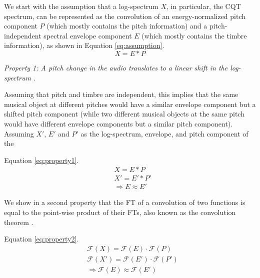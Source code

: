 \documentclass[journal]{IEEEtran}
\begin{document}


We start with the assumption that a log-spectrum $X$, in particular, the CQT spectrum, can be represented as the convolution of an energy-normalized pitch component $P$ (which mostly contains the pitch information) and a pitch-independent spectral envelope component $E$ (which mostly contains the timbre information), as shown in Equation \ref{eq:assumption}.
\begin{equation}
\label{eq:assumption}
X = E * P
\end{equation}

\emph{Property 1: A pitch change in the audio translates to a linear shift in the log-spectrum \cite{brown1991, brown1992}.}

Assuming that pitch and timbre are independent, this implies that the same musical object at different pitches would have a similar envelope component but a shifted pitch component (while two different musical objects at the same pitch would have different envelope components but a similar pitch component). Assuming $X'$, $E'$ and $P'$ as the log-spectrum, envelope, and pitch component of the 



Equation \ref{eq:property1}.
\begin{equation}
\label{eq:property1}
\begin{split}
&X = E * P \\
&X' = E' * P' \\
&\Rightarrow E \approx E'
\end{split}
\end{equation}


We show in a second property that the FT of a convolution of two functions is equal to the point-wise product of their FTs, also known as the convolution theorem \cite{proakis1995}.

Equation \ref{eq:property2}.
\begin{equation}
\label{eq:property2}
\begin{split}
&\mathcal{F}(X) = \mathcal{F}(E) \cdot \mathcal{F}(P) \\
&\mathcal{F}(X') = \mathcal{F}(E') \cdot \mathcal{F}(P') \\
&\Rightarrow \mathcal{F}(E) \approx \mathcal{F}(E')
\end{split}
\end{equation}
\end{document}
